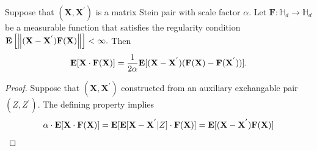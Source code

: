 \begin{lemma}
  Suppose that
  $
  (
    \mathbf{X}
    ,
    \mathbf{X}^{'}
  )
  $
  is a matrix Stein pair with scale factor $\alpha.$
  Let 
  $
    \mathbf{F}
    :
    \mathbb{H}_d
    \to
    \mathbb{H}_d
  $
  be a measurable function that satisfies the regularity condition
  $
  \mathbf{E}
  \left[
  \left\lVert
    (
    \mathbf{X}
    -
    \mathbf{X}^{'}
  )
  \mathbf{F}(\mathbf{X})
  \right\rVert
  \right]
  <
  \infty
  .
  $
  Then
\begin{gather}
  \mathbf{E}
  [
    \mathbf{X}
    \cdot
    \mathbf{F}
    (\mathbf{X})
  ]
  =
  \frac{1}{2\alpha}
  \mathbf{E}
  [
    (
    \mathbf{X}
    -
    \mathbf{X}^{'}
    )
    (
    \mathbf{F}
    (
    \mathbf{X}
    )
    -
    \mathbf{F}
    (
    \mathbf{X}^{'}
    )
  )
  ]
  .
\end{gather}
\end{lemma}
\begin{proof}
  \emph{\cite[Lemma~2.4]{Mackey2014}}
  Suppose that
  $
  (
    \mathbf{X}
    ,
    \mathbf{X}^{'}
  )
  $
  constructed from an auxiliary exchangable pair 
  $
  (
  Z,
  Z^{'}
  )
  .
  $
  The defining property implies
 \begin{gather}
   \alpha \cdot 
   \mathbf{E}[
   \mathbf{X}
   \cdot
   \mathbf{F}
   (\mathbf{X})
   ]
   =
   \mathbf{E}[
    \mathbf{E}[
    \mathbf{X}
    -
    \mathbf{X}^{'}
    \vert
    Z
    ]
    \cdot
   \mathbf{F}
   (\mathbf{X})
   ]
   =
    \mathbf{E}[
    (
    \mathbf{X}
    -
    \mathbf{X}^{'}
    )
   \mathbf{F}
   (\mathbf{X})
   ]
 \end{gather} 
\end{proof}
